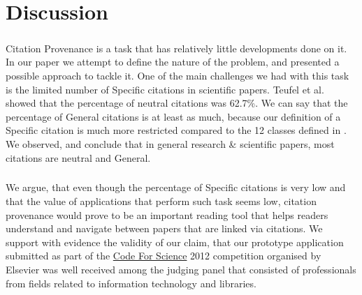 \chapter{Discussion}
\label{discussion}
\paragraph{}
Citation Provenance is a task that has relatively little developments done on it. In our paper we attempt to define the nature of the problem, and presented a possible approach to tackle it. One of the main challenges we had with this task is the limited number of Specific citations in scientific papers. Teufel et al. showed that the percentage of neutral citations was 62.7\%. We can say that the percentage of General citations is at least as much, because our definition of a Specific citation is much more restricted compared to the 12 classes defined in \cite{teufel2009annotation}. We observed, and conclude that in general research \& scientific papers, most citations are neutral and General.

\paragraph{}
We argue, that even though the percentage of Specific citations is very low and that the value of applications that perform such task seems low, citation provenance would prove to be an important reading tool that helps readers understand and navigate between papers that are linked via citations. We support with evidence the validity of our claim, that our prototype application submitted as part of the \url{Code For Science} 2012 competition organised by Elsevier was well received among the judging panel that consisted of professionals from fields related to information technology and libraries.

